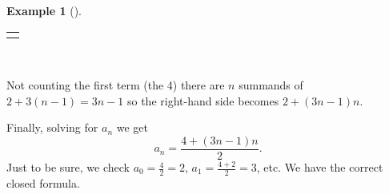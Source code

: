 \documentclass[10pt,]{book}
\theoremstyle{plain}
\theoremstyle{definition}
\theoremstyle{definition}
\newtheorem{example}[theorem]{Example}
\theoremstyle{definition}
\theoremstyle{definition}
\numberwithin{equation}{chapter}
\newlength{\panelmax}
\renewcommand{\d}{\displaystyle}
\begin{document}
\begin{example}[]
{%
\setlength{\tabcolsep}{0\linewidth}
\par\medskip\noindent
\begin{tabular}{@{}*{1}{c}@{}}
\begin{minipage}[c][\panelmax][t]{1\linewidth}\usebox{\panelboxAtabular}\end{minipage}\end{tabular}\\
}%
\par
\hypertarget{p-154}{}%
Not counting the first term (the 4) there are \(n\) summands of \(2+3(n-1) = 3n-1\) so the right-hand side becomes \(2+(3n-1)n\).%
\par
\hypertarget{p-155}{}%
Finally, solving for \(a_n\) we get%
\begin{equation*}
a_n = \d \frac{4+(3n-1)n}{2}.
\end{equation*}
Just to be sure, we check \(a_0 = \frac{4}{2} = 2\), \(a_1 = \frac{4+2}{2} = 3\), etc.  We have the correct closed formula.%
\end{example}
\typeout{************************************************}
\typeout{************************************************}
\end{document}
